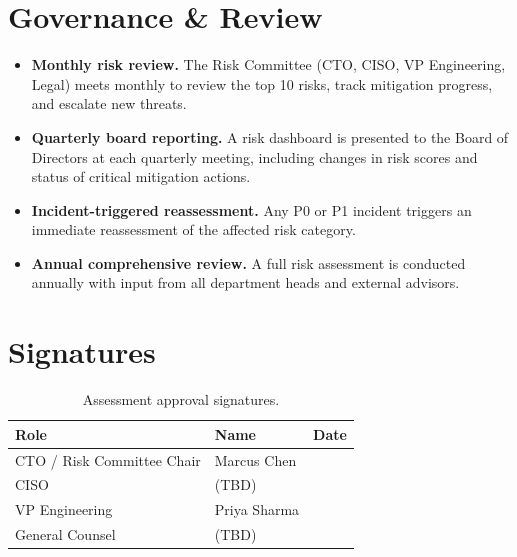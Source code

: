 \documentclass[
    language=english,
    doctype=risk-assessment,
    institution=none,
]{../../omnilatex}
\begin{document}
\section{Governance \& Review}

\begin{itemize}
    \item \textbf{Monthly risk review.} The Risk Committee (CTO, CISO,
        VP Engineering, Legal) meets monthly to review the top 10 risks,
        track mitigation progress, and escalate new threats.
    \item \textbf{Quarterly board reporting.} A risk dashboard is presented
        to the Board of Directors at each quarterly meeting, including
        changes in risk scores and status of critical mitigation actions.
    \item \textbf{Incident-triggered reassessment.} Any P0 or P1 incident
        triggers an immediate reassessment of the affected risk category.
    \item \textbf{Annual comprehensive review.} A full risk assessment is
        conducted annually with input from all department heads and external
        advisors.
\end{itemize}

\section{Signatures}

\begin{table}[h]
    \centering
    \begin{tabular}{lll}
        \toprule
        \textbf{Role} & \textbf{Name} & \textbf{Date} \\
        \midrule
        CTO / Risk Committee Chair & Marcus Chen & \underline{\hspace{3cm}} \\
        CISO                        & (TBD) & \underline{\hspace{3cm}} \\
        VP Engineering              & Priya Sharma & \underline{\hspace{3cm}} \\
        General Counsel             & (TBD) & \underline{\hspace{3cm}} \\
        \bottomrule
    \end{tabular}
    \caption{Assessment approval signatures.}
\end{table}

\printbibliography[heading=none]
\end{document}
